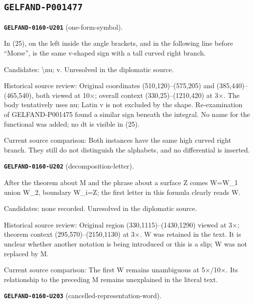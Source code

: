 \subsection*{\texttt{GELFAND-P001477}}
\par\noindent\leavevmode{}\label{GELFAND-0160-U201}\label{GELFAND-P001477:one-form-symbol}\textbf{\texttt{GELFAND-0160-U201}} (one-form-symbol).\nopagebreak[4]\par
In (25), on the left inside the angle brackets, and in the following line before “Morse”, is the same v-shaped sign with a tall curved right branch.\par
Candidates: \textbackslash{}nu; v. Unresolved in the diplomatic source.\par
Historical source review: Original coordinates (510,120)–(575,205) and (385,440)–(465,540), both viewed at 10×; overall context (330,25)–(1210,420) at 3×. The body tentatively uses nu; Latin v is not excluded by the shape. Re-examination of GELFAND-P001475 found a similar sign beneath the integral. No name for the functional was added; no dt is visible in (25).\par
Current source comparison: Both instances have the same high curved right branch. They still do not distinguish the alphabets, and no differential is inserted.\par\medskip
\par\noindent\leavevmode{}\label{GELFAND-0160-U202}\label{GELFAND-P001477:decomposition-letter}\textbf{\texttt{GELFAND-0160-U202}} (decomposition-letter).\nopagebreak[4]\par
After the theorem about M and the phrase about a surface Z comes W=W\_1 union W\_2, boundary W\_i=Z; the first letter in this formula clearly reads W.\par
Candidates: none recorded. Unresolved in the diplomatic source.\par
Historical source review: Original region (330,1115)–(1430,1290) viewed at 3×; theorem context (295,570)–(2150,1130) at 3×. W was retained in the text. It is unclear whether another notation is being introduced or this is a slip; W was not replaced by M.\par
Current source comparison: The first W remains unambiguous at 5×/10×. Its relationship to the preceding M remains unexplained in the literal text.\par\medskip
\par\noindent\leavevmode{}\label{GELFAND-0160-U203}\label{GELFAND-P001477:cancelled-representation-word}\textbf{\texttt{GELFAND-0160-U203}} (cancelled-representation-word).\nopagebreak[4]\par
